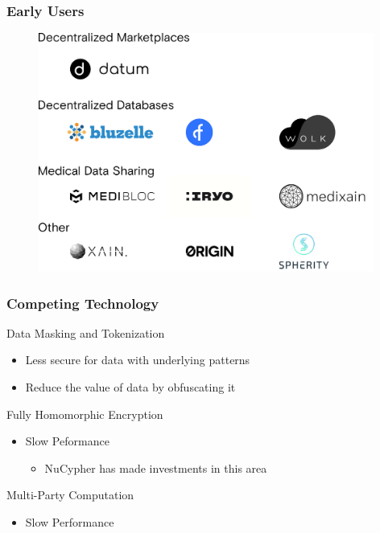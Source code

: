 \documentclass[xetex,mathsans,sans]{beamer}
\begin{document}
    \begin{frame}
      \frametitle{Early Users}
      \begin{figure}
           \includegraphics[width=11cm]{pdf/projects.pdf}
      \end{figure}
    \end{frame}

    \begin{frame}
      \frametitle{Competing Technology}
       Data Masking and Tokenization
       \begin{itemize}
           \item Less secure for data with underlying patterns
           \item Reduce the value of data by obfuscating it
       \end{itemize}
      
       Fully Homomorphic Encryption
       \begin{itemize}
           \item Slow Peformance
           \begin{itemize}
               \item NuCypher has made investments in this area
           \end{itemize}
       \end{itemize}
       
       Multi-Party Computation
       \begin{itemize}
           \item Slow Performance
       \end{itemize}
     \end{frame}
    
\end{document}
